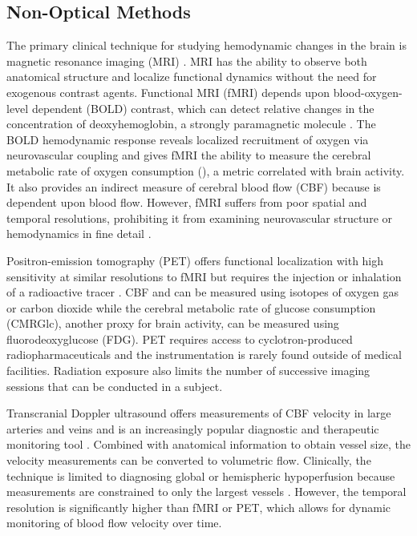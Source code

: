 \subsection{Non-Optical Methods}

The primary clinical technique for studying hemodynamic changes in the brain is magnetic resonance imaging (MRI) \cite{Calamante:2016dg}. MRI has the ability to observe both anatomical structure and localize functional dynamics without the need for exogenous contrast agents. Functional MRI (fMRI) depends upon blood-oxygen-level dependent (BOLD) contrast, which can detect relative changes in the concentration of deoxyhemoglobin, a strongly paramagnetic molecule \cite{Glover:2011eo}. The BOLD hemodynamic response reveals localized recruitment of oxygen via neurovascular coupling and gives fMRI the ability to measure the cerebral metabolic rate of oxygen consumption (), a metric correlated with brain activity. It also provides an indirect measure of cerebral blood flow (CBF) because  is dependent upon blood flow. However, fMRI suffers from poor spatial and temporal resolutions, prohibiting it from examining neurovascular structure or hemodynamics in fine detail \cite{Glover:2011eo}.

Positron-emission tomography (PET) offers functional localization with high sensitivity at similar resolutions to fMRI but requires the injection or inhalation of a radioactive tracer \cite{Wintermark:2005dd}. CBF and  can be measured using isotopes of oxygen gas or carbon dioxide while the cerebral metabolic rate of glucose consumption (CMRGlc), another proxy for brain activity, can be measured using  fluorodeoxyglucose (FDG). PET requires access to cyclotron-produced radiopharmaceuticals and the instrumentation is rarely found outside of medical facilities. Radiation exposure also limits the number of successive imaging sessions that can be conducted in a subject.

Transcranial Doppler ultrasound offers measurements of CBF velocity in large arteries and veins and is an increasingly popular diagnostic and therapeutic monitoring tool \cite{Sarkar:2007fk}. Combined with anatomical information to obtain vessel size, the velocity measurements can be converted to volumetric flow. Clinically, the technique is limited to diagnosing global or hemispheric hypoperfusion because measurements are constrained to only the largest vessels \cite{Naqvi:2013hd}. However, the temporal resolution is significantly higher than fMRI or PET, which allows for dynamic monitoring of blood flow velocity over time.

